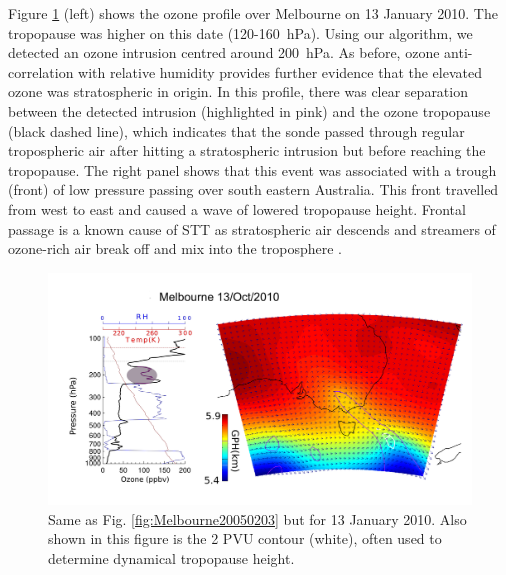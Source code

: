 \documentclass[acp, manuscript]{copernicus} %
\begin{document}
    Figure \ref{fig:Melbourne20100113} (left) shows the ozone profile over Melbourne on 13 January 2010.
    The tropopause was higher on this date (120-160~hPa).
    Using our algorithm, we detected an ozone intrusion centred around 200~hPa.
    As before, ozone anti-correlation with relative humidity provides further evidence that the elevated ozone was stratospheric in origin.
    In this profile, there was clear separation between the detected intrusion (highlighted in pink) and the ozone tropopause (black dashed line), which indicates that the sonde passed through regular tropospheric air after hitting a stratospheric intrusion but before reaching the tropopause.
    The right panel shows that this event was associated with a trough (front) of low pressure passing over south eastern Australia.
    This front travelled from west to east and caused a wave of lowered tropopause height. 
    Frontal passage is a known cause of STT as stratospheric air descends and streamers of ozone-rich air break off and mix into the troposphere \citep{Sprenger2003}.
    
    \begin{figure}[t]
      \includegraphics[width=14.0cm]{figures/Melbourne20100113.png}
      \caption{Same as Fig. \ref{fig:Melbourne20050203} but for 13 January 2010.
	Also shown in this figure is the 2 PVU contour (white), often used to determine dynamical tropopause height.}
      \label{fig:Melbourne20100113}
    \end{figure}
\end{document}
